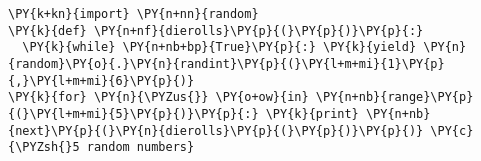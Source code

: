 \begin{Verbatim}[commandchars=\\\{\}]
\PY{k+kn}{import} \PY{n+nn}{random}
\PY{k}{def} \PY{n+nf}{dierolls}\PY{p}{(}\PY{p}{)}\PY{p}{:}
  \PY{k}{while} \PY{n+nb+bp}{True}\PY{p}{:} \PY{k}{yield} \PY{n}{random}\PY{o}{.}\PY{n}{randint}\PY{p}{(}\PY{l+m+mi}{1}\PY{p}{,}\PY{l+m+mi}{6}\PY{p}{)}
\PY{k}{for} \PY{n}{\PYZus{}} \PY{o+ow}{in} \PY{n+nb}{range}\PY{p}{(}\PY{l+m+mi}{5}\PY{p}{)}\PY{p}{:} \PY{k}{print} \PY{n+nb}{next}\PY{p}{(}\PY{n}{dierolls}\PY{p}{(}\PY{p}{)}\PY{p}{)} \PY{c}{\PYZsh{}5 random numbers}
\end{Verbatim}
